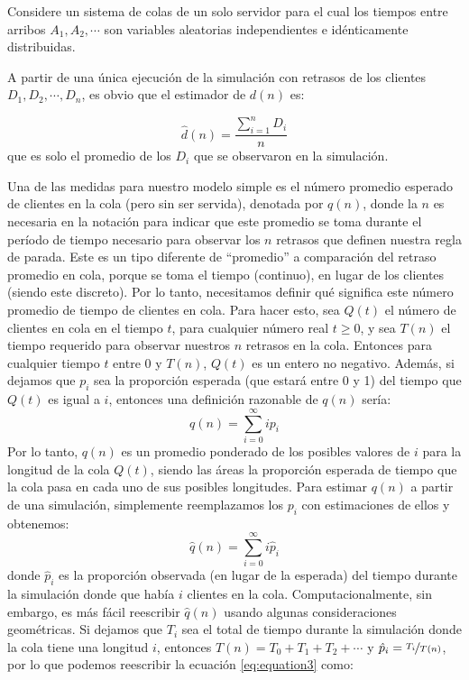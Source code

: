 Considere un sistema de colas de un solo servidor para el cual los tiempos entre arribos $A_{1}, A_{2}, \cdots$ son variables aleatorias independientes e idénticamente distribuidas.

A partir de una única ejecución de la simulación con retrasos de los clientes $D_{1}, D_{2}, \cdots, D_{n}$, es obvio que el
estimador de $d(n)$ es:

\begin{equation} \label{eq:equation}
\hat{d}(n) = \frac{\sum_{i = 1}^{n}D_{i}}{n}
\end{equation}
que es solo el promedio de los $D_{i}$ que se observaron en la simulación.

Una de las medidas para nuestro modelo simple es el número promedio esperado de clientes en la cola (pero sin
ser servida), denotada por $q(n)$, donde la $n$ es necesaria en la notación para indicar que este promedio se
toma durante el período de tiempo necesario para observar los $n$ retrasos que definen
nuestra regla de parada.
Este es un tipo diferente de ``promedio'' a comparación del retraso promedio en cola, porque se toma el tiempo
(continuo), en lugar de los clientes (siendo este discreto).
Por lo tanto, necesitamos definir qué significa este número promedio de tiempo de
clientes en cola.
Para hacer esto, sea $Q(t)$ el número de clientes en cola en el tiempo $t$, para cualquier número real $t \geq 0$,
y sea $T(n)$ el tiempo requerido para observar nuestros $n$ retrasos en la cola.
Entonces para cualquier tiempo $t$ entre $0$ y $T(n)$, $Q(t)$ es un entero no negativo. Además, si dejamos que $p_{i}$ sea la
proporción esperada (que estará entre 0 y 1) del tiempo que $Q(t)$ es igual a $i$, entonces una definición
razonable de $q(n)$ sería:
 \begin{equation}
   \label{eq:equation2}
q(n) = \sum_{i=0}^{\infty}ip_{i}
 \end{equation}
Por lo tanto, $q(n)$ es un promedio ponderado de los posibles valores de $i$ para la longitud de la cola $Q(t)$,
siendo las áreas la proporción esperada de tiempo que la cola pasa en cada uno de sus posibles longitudes.
Para estimar $q(n)$ a partir de una simulación, simplemente reemplazamos los $p_{i}$ con estimaciones de ellos y
obtenemos:
\begin{equation}
  \label{eq:equation3}
  \hat{q}(n) = \sum_{i=0}^{\infty}i\hat{p}_{i}
\end{equation}
donde $\hat{p}_{i}$ es la proporción observada (en lugar de la esperada) del tiempo durante la simulación
donde que había $i$ clientes en la cola.
Computacionalmente, sin embargo, es más fácil reescribir $\hat{q}(n)$ usando algunas consideraciones geométricas.
Si dejamos que $T_{i}$ sea el total de tiempo durante la simulación donde la cola tiene una longitud $i$, entonces
$T(n) = T_{0} + T_{1} + T_{2} + \cdots$ y $\hat{p}_{i} = \nicefrac{T_{i}}{T(n)}$, por lo que podemos reescribir la ecuación \ref{eq:equation3} como:

